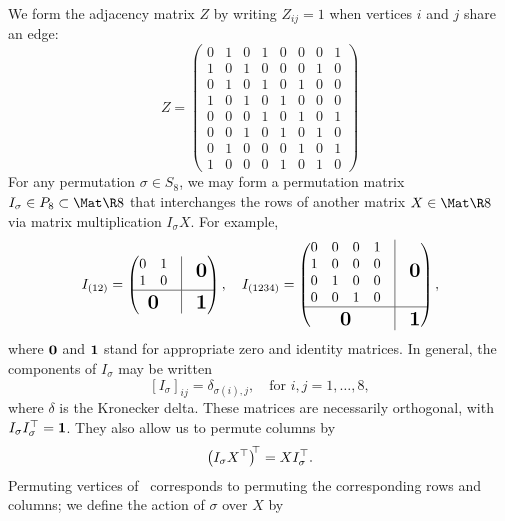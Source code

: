 We form the adjacency matrix $Z$ by writing $Z_{ij} = 1$ when vertices $i$ and $j$ share an
edge:
\[
Z = \begin{pmatrix}
0 & 1 & 0 & 1 & 0 & 0 & 0 & 1 \\
1 & 0 & 1 & 0 & 0 & 0 & 1 & 0 \\
0 & 1 & 0 & 1 & 0 & 1 & 0 & 0 \\
1 & 0 & 1 & 0 & 1 & 0 & 0 & 0 \\
0 & 0 & 0 & 1 & 0 & 1 & 0 & 1 \\
0 & 0 & 1 & 0 & 1 & 0 & 1 & 0 \\
0 & 1 & 0 & 0 & 0 & 1 & 0 & 1 \\
1 & 0 & 0 & 0 & 1 & 0 & 1 & 0
\end{pmatrix}
\]
For any permutation $\sigma \in S_8$, we may form a permutation matrix $I_\sigma \in P_8
\subset \Mat\R8$ that interchanges the rows of another matrix $X \in \Mat\R8$ via matrix
multiplication $I_\sigma X$. For example,
\[
I_{(12)} = \begin{pmatrix}
\begin{matrix} 0 & 1 \\ 1 & 0 \end{matrix} &\vline& \mLarge{\mm 0} \\ \hline\topstrut{3ex}
\mLarge{\mm 0} &\vline& \mLarge{\mm 1}
\end{pmatrix},\quad
I_{(1234)} = \begin{pmatrix}
\begin{matrix}
0 & 0 & 0 & 1 \\
1 & 0 & 0 & 0 \\
0 & 1 & 0 & 0 \\
0 & 0 & 1 & 0
\end{matrix} &\vline& \mLarge{\mm 0} \\ \hline\topstrut{3ex}
\mLarge{\mm 0} &\vline& \mLarge{\mm 1}
\end{pmatrix},
\]
where $\mathbf{0}$ and $\mathbf{1}$ stand for appropriate zero and identity matrices. In general, the
components of $I_\sigma$ may be written
\begin{equation}\label{eqn:8-permmat}
[I_\sigma]_{ij} = \delta_{\sigma(i),j},\quad \text{for } i, j = 1,\dotsc,8,
\end{equation}
where $\delta$ is the Kronecker delta. These matrices are necessarily orthogonal, with
$I_\sigma\trans{I_\sigma} = \mm 1$. They also allow us to permute columns by
\[ \trans*{I_\sigma\trans X} = X\trans{I_\sigma}. \]
Permuting vertices of \Cube\ corresponds to permuting the corresponding rows and columns; we
define the action of $\sigma$ over $X$ by
